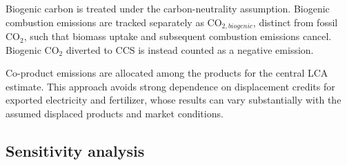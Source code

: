 Biogenic carbon is treated under the carbon-neutrality assumption. Biogenic combustion emissions are tracked separately as \(\text{CO$_{2, biogenic}$}\), distinct from fossil CO$_2$, such that biomass uptake and subsequent combustion emissions cancel. Biogenic CO$_2$ diverted to CCS is instead counted as a negative emission.


Co-product emissions are allocated among the products for the central LCA estimate. This approach avoids strong dependence on displacement credits for exported electricity and fertilizer, whose results can vary substantially with the assumed displaced products and market conditions. 


\subsection{Sensitivity analysis}\label{sec:methods-sens}




